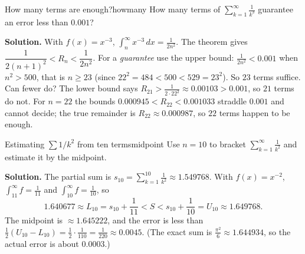 \documentclass[11pt]{article}
\begin{document}
\begin{exmp}{How many terms are enough?}{howmany}
How many terms of $\displaystyle\sum_{k=1}^\infty\frac1{k^3}$ guarantee an error less than $0.001$?

\textbf{Solution.} With $f(x)=x^{-3}$, $\displaystyle\int_n^\infty x^{-3}\,dx=\frac1{2n^2}$. The theorem gives $\dfrac1{2(n+1)^2}<R_n<\dfrac1{2n^2}$. For a \emph{guarantee} use the upper bound: $\frac1{2n^2}<0.001$ when $n^2>500$, that is $n\ge23$ (since $22^2=484<500<529=23^2$). So $23$ terms suffice. Can fewer do? The lower bound says $R_{21}>\frac1{2\cdot22^2}\approx0.00103>0.001$, so $21$ terms do not. For $n=22$ the bounds $0.000945<R_{22}<0.001033$ straddle $0.001$ and cannot decide; the true remainder is $R_{22}\approx0.000987$, so $22$ terms happen to be enough.
\end{exmp}

\begin{exmp}{Estimating $\sum1/k^2$ from ten terms}{midpoint}
Use $n=10$ to bracket $\displaystyle\sum_{k=1}^\infty\frac1{k^2}$ and estimate it by the midpoint.

\textbf{Solution.} The partial sum is $s_{10}=\sum_{k=1}^{10}\frac1{k^2}\approx1.549768$. With $f(x)=x^{-2}$, $\int_{11}^\infty f=\frac1{11}$ and $\int_{10}^\infty f=\frac1{10}$, so
\[
1.640677\approx L_{10}=s_{10}+\frac1{11}<S<s_{10}+\frac1{10}=U_{10}\approx1.649768 .
\]
The midpoint is $\approx1.645222$, and the error is less than $\frac12(U_{10}-L_{10})=\frac12\cdot\frac1{110}=\frac1{220}\approx0.0045$. (The exact sum is $\frac{\pi^2}6\approx1.644934$, so the actual error is about $0.0003$.)
\end{exmp}
\end{document}
